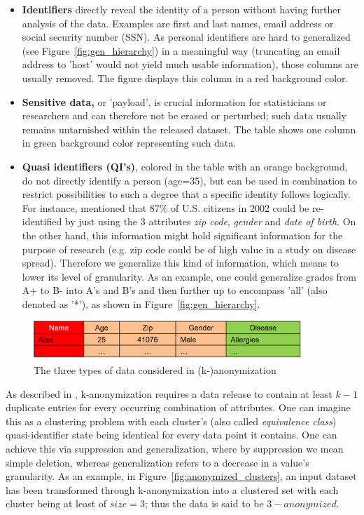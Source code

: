 \documentclass{llncs}
\begin{document}
\begin{itemize}
	\item \textbf{Identifiers} directly reveal the identity of a person without having further analysis of the data. Examples are first and last names, email address or social security number (SSN). As personal identifiers are hard to generalized (see Figure~\ref{fig:gen_hierarchy}) in a meaningful way (truncating an email address to 'host' would not yield much usable information), those columns are usually removed. The figure displays this column in a red background color.
	\item \textbf{Sensitive data,} or 'payload', is crucial information for statisticians or researchers and can therefore not be erased or perturbed; such data usually remains untarnished within the released dataset. The table shows one column in green background color representing such data.
	\item \textbf{Quasi identifiers (QI's)}, colored in the table with an orange background, do not directly identify a person (age=35), but can be used in combination to restrict possibilities to such a degree that a specific identity follows logically. For instance, \cite{sweeney2002k} mentioned that 87\% of U.S. citizens in 2002 could be re-identified by just using the 3 attributes \textit{zip code}, \textit{gender} and \textit{date of birth}. On the other hand, this information might hold significant information for the purpose of research (e.g. zip code could be of high value in a study on disease spread). Therefore we generalize this kind of information, which means to lower its level of granularity. As an example, one could generalize grades from A+ to B- into A's and B's and then further up to encompass 'all' (also denoted as '*'), as shown in Figure~\ref{fig:gen_hierarchy}.
\end{itemize}

\begin{figure}[H]
	\begin{center}
		\includegraphics[width=0.9\textwidth]{figures/theory/3typesofdata}
		\caption{The three types of data considered in (k-)anonymization}
		\label{fig:anon_categories}
	\end{center}
\end{figure}

As described in \cite{ciriani2007kappa}, k-anonymization requires a data release to contain at least $k-1$ duplicate entries for every occurring combination of attributes. One can imagine this as a clustering problem with each cluster's (also called \textit{equivalence class}) quasi-identifier state being identical for every data point it contains. One can achieve this via suppression and generalization, where by suppression we mean simple deletion, whereas generalization refers to a decrease in a value's granularity. As an example, in Figure~\ref{fig:anonymized_clusters}, an input dataset has been transformed through k-anonymization into a clustered set with each cluster being at least of $size = 3$; thus the data is said to be $3-anonymized$.
\end{document}
